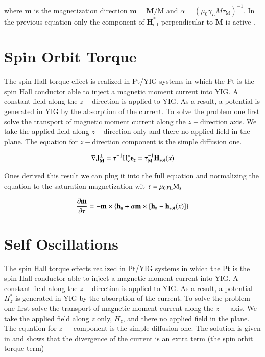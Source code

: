 \documentclass[review]{elsarticle}
\begin{document}
where $\mathbf{m}$ is the magnetization direction $\mathbf{m} = \mathbf{M}/\mathrm{M}$ and $\alpha = (\mu_0\gamma_L M \tau_{\mathrm{M}})^{-1}$. In the previous equation only the component of $\mathbf{H}_\mathrm{eff}^*$ perpendicular to $\mathbf{M}$ is active . 

\section{Spin Orbit Torque}

The spin Hall torque effect is realized in Pt/YIG systems in which the Pt is the spin Hall conductor able to inject a magnetic moment current into YIG. A constant field along the $z-$direction  is applied to YIG. As a result, a potential is generated in YIG by the absorption of the current. To solve the problem one first solve the transport of magnetic moment current along the $z-$direction axis. We take the applied field along $z-$direction only and there no applied field in the plane. The equation for $z-$direction component is the simple diffusion one. 

\begin{equation}
\nabla\mathbf{J}^{\perp}_{\mathbf{M}}=\tau^{-1}\mathrm{H}^*_{\mathrm{\tiny{z}}}\mathbf{e}_z= \tau^{-1}_\mathrm{M}\mathbf{H}_{\mathrm{\tiny{sot}}}(x)
\end{equation}

Ones derived this result we can plug it into the full equation and normalizing the equation to the saturation magnetization wit $\tau=\mu_0\gamma_{\mathrm{\tiny{L}}}\mathrm{M}_{\mathrm{\tiny{s}}}$

\begin{equation}
\label{equation:dimensionless_lle}
\frac{\partial \mathbf{m}}{\partial  \tau}=-\mathbf{m} \times \left\{ \mathbf{h}_{\mathrm{\tiny{a}}}+\alpha \mathbf{m} \times[ \mathbf{h}_{\mathrm{\tiny{a}}}-\mathbf{h}_{\mathrm{\tiny{sot}}}(x)\right]\}
\end{equation}

\section{Self Oscillations}

The spin Hall torque effects  realized in Pt/YIG systems in which the Pt is the spin Hall conductor able to inject a magnetic moment current into YIG. A constant field along the $z-$direction is applied to YIG. As a result, a potential $H^*_z$ is generated in YIG by the absorption of the current. To solve the problem one first solve the transport of magnetic moment current along the $z-$ axis. We take the applied field along $z$ only, $H_z$, and there no applied field in the plane. The equation for $z-$ component is the simple diffusion one. The solution is given in \cite{SECT:ADIFF} and shows that the divergence of the current is an extra term (the spin orbit torque term)
\end{document}
